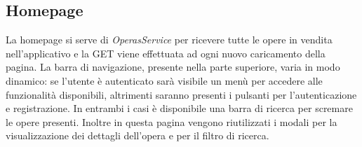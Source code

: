 \documentclass[11pt]{article}
\begin{document}
\subsection{Homepage}
La homepage si serve di \textit{OperasService} per ricevere tutte le opere in vendita nell'applicativo e la GET viene effettuata ad ogni nuovo caricamento della pagina. La barra di navigazione, presente nella parte superiore, varia in modo dinamico: se l'utente è autenticato sarà visibile un menù per accedere alle funzionalità disponibili, altrimenti saranno presenti i pulsanti per l'autenticazione e registrazione. In entrambi i casi è disponibile una barra di ricerca per scremare le opere presenti. Inoltre in questa pagina vengono riutilizzati i modali per la visualizzazione dei dettagli dell'opera e per il filtro di ricerca.
\end{document}
